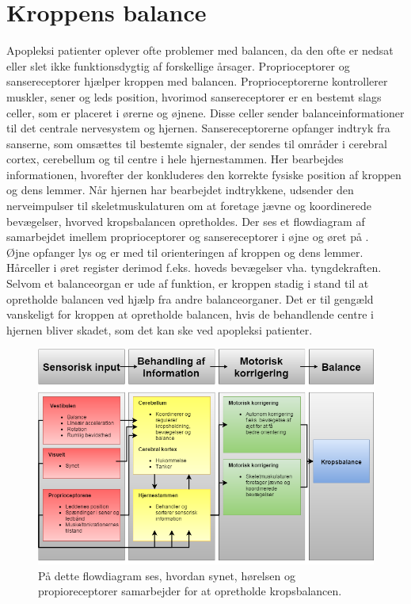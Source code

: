 \chapter{Kroppens balance}\label{app-Balance}
Apopleksi patienter oplever ofte problemer med balancen, da den ofte er nedsat eller slet ikke funktionsdygtig af forskellige årsager. \cite{Karnath2003} Proprioceptorer og sansereceptorer hjælper kroppen med balancen. Proprioceptorerne kontrollerer muskler, sener og leds position, hvorimod sansereceptorer er en bestemt slags celler, som er placeret i ørerne og øjnene. \cite{Martini2012} Disse celler sender balanceinformationer til det centrale nervesystem og hjernen. Sansereceptorerne opfanger indtryk fra sanserne, som omsættes til bestemte signaler, der sendes til områder i cerebral cortex, cerebellum og til centre i hele hjernestammen. Her bearbejdes informationen, hvorefter der konkluderes den korrekte fysiske position af kroppen og dens lemmer. Når hjernen har bearbejdet indtrykkene, udsender den nerveimpulser til skeletmuskulaturen om at foretage jævne og koordinerede bevægelser, hvorved kropsbalancen opretholdes.\cite{Martini2012} Der ses et flowdiagram af samarbejdet imellem proprioceptorer og sansereceptorer i øjne og øret på . \\
Øjne opfanger lys og er med til orienteringen af kroppen og dens lemmer. Hårceller i øret register derimod f.eks. hoveds bevægelser vha. tyngdekraften. Selvom et balanceorgan er ude af funktion, er kroppen stadig i stand til at opretholde balancen ved hjælp fra andre balanceorganer. Det er til gengæld vanskeligt for kroppen at opretholde balancen, hvis de behandlende centre i hjernen bliver skadet, som det kan ske ved apopleksi patienter. \cite{Martini2012} \\
\begin{figure}[H]
	\centering
	\includegraphics[scale=0.4]{figures/bProblemanalyse/Balance-Flowdiagram.png}
	\caption{På dette flowdiagram ses, hvordan synet, hørelsen og propioreceptorer samarbejder for at opretholde kropsbalancen. }
	\label{flowbalance}
\end{figure}

